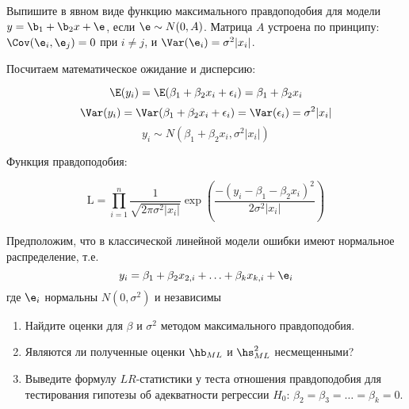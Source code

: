 \documentclass[pdftex,11pt,openany]{book}\usepackage[]{graphicx}\usepackage[]{color}
\begin{document}
\begin{problem}
Выпишите в явном виде функцию максимального правдоподобия для модели $y=\b_1+\b_2 x+\e$, если $\e\sim N(0,A)$.
Матрица $A$ устроена по принципу: $\Cov(\e_i,\e_j)=0$ при $i\neq j$, и $\Var(\e_i)=\sigma^2 |x_i|$.
\end{problem}

\begin{solution}
 Посчитаем математическое ожидание и дисперсию:

\[\E(y_i) = \E(\beta_1 + \beta_2x_i + \epsilon_i) = \beta_1 + \beta_2x_i\]
\[\Var(y_i)= \Var(\beta_1 + \beta_2x_i + \epsilon_i) = \Var(\epsilon_i) = \sigma^2|x_i|\]
\[y_i \sim N(\beta_1 + \beta_2x_i, \sigma^2|x_i|)\]

Функция правдоподобия:

\[\text{L} = \prod_{i=1}^{n} \frac{1}{\sqrt{2\pi \sigma^2|x_i|}}\exp\left( \frac{-(y_i - \beta_1 - \beta_2x_i)^2}{2\sigma^2|x_i|}\right) \]
\end{solution}


\begin{problem}
Предположим, что в классической линейной модели ошибки имеют нормальное распределение, т.е.
\[
y_i=\beta_1+\beta_2 x_{2,i}+\ldots+\beta_k x_{k,i}+\e_i
\]
где $\e_i$ нормальны $N(0,\sigma^2)$ и независимы
\begin{enumerate}
\item Найдите оценки для $\beta$ и $\sigma^2$ методом максимального правдоподобия.
\item Являются ли полученные оценки $\hb_{ML}$ и $\hs^2_{ML}$ несмещенными?
\item Выведите формулу $LR$-статистики у теста отношения правдоподобия для тестирования гипотезы об адекватности регрессии $H_0$: $\beta_2=\beta_3=\ldots=\beta_k=0$.
\end{enumerate}
\end{problem}
\end{document}
